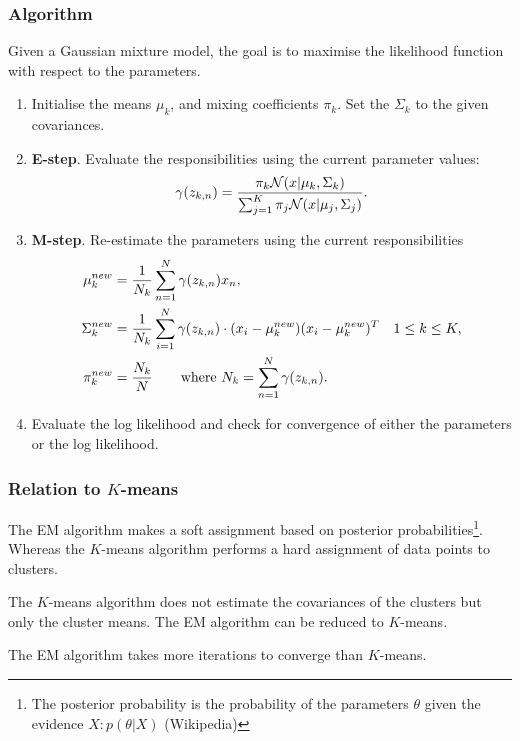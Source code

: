 \subsubsection{Algorithm}
Given a Gaussian mixture model, the goal is to maximise the likelihood function with respect to the parameters.
\begin{enumerate}
    \item Initialise the means $\mu_k$, and mixing coefficients $\pi_k$. Set the $\Sigma_k$ to the given covariances.
    \item \textbf{E-step}. Evaluate the responsibilities using the current parameter values:
        \begin{align*}
             \gamma(z_{k,n}) = {\pi_k \mathcal N(x|\mu_k, \Sigma_k)\over \sum_{j=1}^K \pi_j \mathcal N(x|\mu_j, \Sigma_j)}.
        \end{align*}
    \item \textbf{M-step}. Re-estimate the parameters using the current responsibilities
        \begin{align*}
            \mu_k^{new} &= {1\over N_k} \sum_{n=1}^N \gamma(z_{k,n}) x_n,\\
            \Sigma_k^{new} &= {1\over N_k} \sum_{i=1}^N \gamma(z_{k,n})\cdot (x_i-\mu_k^{new})(x_i-\mu_k^{new})^T &1\leq k \leq K,\\
            \pi_k^{new} &= {N_k\over N} \qquad\text{where } N_k = \sum_{n=1}^N \gamma(z_{k,n}).
        \end{align*}
    \item Evaluate the log likelihood and check for convergence of either the parameters or the log likelihood.
\end{enumerate}

\subsubsection{Relation to $K$-means}
The EM algorithm makes a soft assignment based on posterior probabilities\footnote{The posterior probability is the probability of the parameters $\theta$ given the evidence $X: p(\theta|X)$ (Wikipedia)}. Whereas the $K$-means algorithm performs a hard assignment of data points to clusters.

The $K$-means algorithm does not estimate the covariances of the clusters but only the cluster means. The EM algorithm can be reduced to $K$-means.

The EM algorithm takes more iterations to converge than $K$-means.


